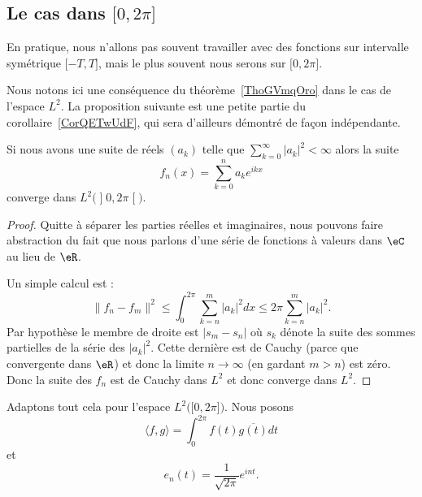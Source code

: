 \subsection{Le cas dans \( \mathopen[ 0 , 2\pi \mathclose]\)}

En pratique, nous n'allons pas souvent travailler avec des fonctions sur intervalle symétrique \( \mathopen[ -T , T \mathclose]\), mais le plus souvent nous serons sur \( \mathopen[ 0 , 2\pi \mathclose]\).

Nous notons ici une conséquence du théorème~\ref{ThoGVmqOro} dans le cas de l'espace \( L^2\). La proposition suivante est une petite partie du corollaire~\ref{CorQETwUdF}, qui sera d'ailleurs démontré de façon indépendante.

\begin{proposition}
    Si nous avons une suite de réels \( (a_k)\) telle que \( \sum_{k=0}^{\infty}| a_k |^2<\infty\) alors la suite
    \begin{equation}
        f_n(x)=\sum_{k=0}^na_k e^{ikx}
    \end{equation}
    converge dans \( L^2\big( \mathopen] 0 , 2\pi \mathclose[ \big)\).
\end{proposition}

\begin{proof}
    Quitte à séparer les parties réelles et imaginaires, nous pouvons faire abstraction du fait que nous parlons d'une série de fonctions à valeurs dans \( \eC\) au lieu de \( \eR\).

    Un simple calcul est :
    \begin{equation}    \label{EqHVdJxZT}
        \| f_n-f_m \|^2\leq\int_0^{2\pi}\sum_{k=n}^m| a_k |^2dx\leq 2\pi\sum_{k=n}^m| a_k |^2.
    \end{equation}
    Par hypothèse le membre de droite est \( | s_m-s_n |\) où \( s_k\) dénote la suite des sommes partielles de la série des \( | a_k |^2\). Cette dernière est de Cauchy (parce que convergente dans \( \eR\)) et donc la limite \( n\to\infty\) (en gardant \( m>n\)) est zéro. Donc la suite des \( f_n\) est de Cauchy dans \( L^2\) et donc converge dans \( L^2\).
\end{proof}

Adaptons tout cela pour l'espace \( L^2\big( \mathopen[ 0 , 2\pi \mathclose] \big)\). Nous posons
\begin{equation}        \label{EQooBFKDooMkCZOt}
    \langle f, g\rangle =\int_0^{2\pi}f(t)\overline{ g(t) }dt
\end{equation}
et
\begin{equation}        \label{EQooKMYOooLZCNap}
    e_n(t)=\frac{1}{ \sqrt{ 2\pi } } e^{int}.
\end{equation}


